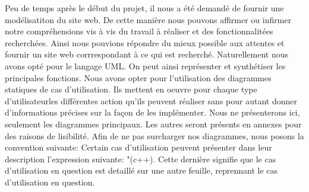 Peu de temps après le début du projet, il nous a été demandé de fournir une modélisatiton du site web. De cette manière
nous pouvons affirmer ou infirmer notre compréhensions vis à vis du travail à réaliser et des fonctionnalitées recherchées.
Ainsi nous pouvions répondre du mieux possible aux attentes et fournir un site web corrrespondant à ce qui est recherché.
Naturellement nous avons opté pour le langage UML. On peut ainsi représenter et synthétiser les principales fonctions. Nous avons opter
pour l'utilisation des diagrammes statiques de cas d'utilisation. Ils mettent en oeuvre pour chaque type d'utilisateurles différentes action 
qu'ils peuvent réaliser sans pour autant donner d'informations précises sur la façon de les implémenter.
Nous ne présenterons ici, seulement les diagrammes principaux. Les autres seront présents en annexes pour des raisons de lisibilité.
Afin de ne pas surcharger nos diagrammes, nous posons la convention suivante: Certain cas d'utilisation peuvent présenter 
dans leur description l'expression suivante: "(c++). Cette dernière signifie que le cas d'utilisation en question est detaillé sur une autre feuille, 
reprennant le cas d'utilisation en question.
